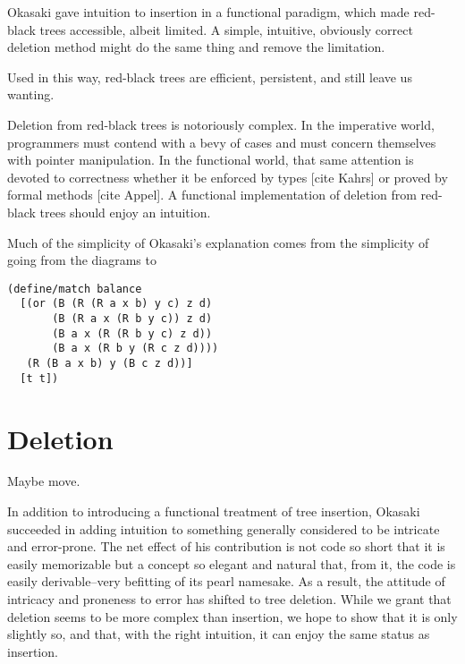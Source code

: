 \documentclass[preprint]{sigplanconf}
\begin{document}
Okasaki gave intuition to insertion in a functional paradigm, which made red-black trees accessible, albeit limited. A simple, intuitive, obviously correct deletion method might do the same thing and remove the limitation.



Used in this way, red-black trees are efficient, persistent, and still leave us wanting.

Deletion from red-black trees is notoriously complex. In the imperative world, programmers must contend with a bevy of cases and must concern themselves with pointer manipulation. In the functional world, that same attention is devoted to correctness whether it be enforced by types [cite Kahrs] or proved by formal methods [cite Appel]. A functional implementation of deletion from red-black trees should enjoy an intuition.







Much of the simplicity of Okasaki's explanation comes from the simplicity of going from the diagrams to
\begin{verbatim}
(define/match balance
  [(or (B (R (R a x b) y c) z d)
       (B (R a x (R b y c)) z d)
       (B a x (R (R b y c) z d))
       (B a x (R b y (R c z d))))
   (R (B a x b) y (B c z d))]
  [t t])
\end{verbatim}






\section{Deletion}

Maybe move.

In addition to introducing a functional treatment of tree insertion, Okasaki succeeded in adding intuition to something generally considered to be intricate and error-prone. The net effect of his contribution is not code so short that it is easily memorizable but a concept so elegant and natural that, from it, the code is easily derivable--very befitting of its pearl namesake. As a result, the attitude of intricacy and proneness to error has shifted to tree deletion. While we grant that deletion seems to be more complex than insertion, we hope to show that it is only slightly so, and that, with the right intuition, it can enjoy the same status as insertion.
\end{document}
